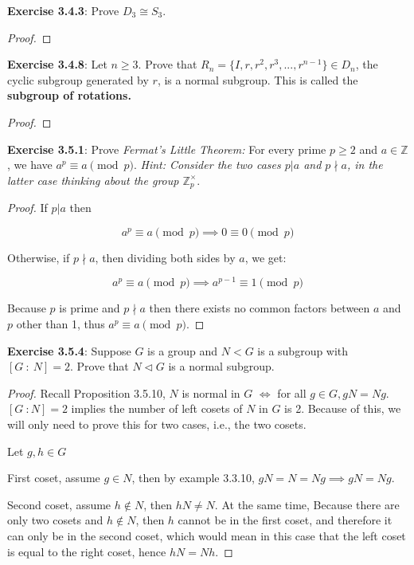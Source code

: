 \documentclass[a4paper]{article}
\begin{document}
\begin{myparindent}{0pt}
\textbf{Exercise 3.4.3}:
Prove $D_3 \cong S_3$.
\begin{proof}
\end{proof}

\textbf{Exercise 3.4.8}:
Let $n \ge 3$. Prove that $R_n = \{ I, r, r^2, r^3, ..., r^{n - 1} \} \in D_n$,
the cyclic subgroup generated by $r$, is a normal subgroup. This is called the
\textbf{subgroup of rotations.}
\begin{proof}
\end{proof}

\textbf{Exercise 3.5.1}:
Prove \textit{Fermat's Little Theorem:} For every prime $p \ge 2$ and
$a \in \mathbb{Z}$, we have $a^p \equiv a \pmod p$. \textit{Hint: Consider the
two cases $p|a$ and $p \nmid a$, in the latter case thinking about the group
$\mathbb{Z}_p^{\times}$}.
\begin{proof}
  If $p | a$ then

  \[ a^p \equiv a \pmod p \implies 0 \equiv 0 \pmod p \]

  Otherwise, if $p \nmid a$, then dividing both sides by $a$, we get:

  \[ a^p \equiv a \pmod p \implies a^{p-1} \equiv 1 \pmod p \]

  Because $p$ is prime and $p \nmid a$ then there exists no common factors
  between $a$ and $p$ other than 1, thus $a^p \equiv a \pmod p$.
\end{proof}

\textbf{Exercise 3.5.4}:
Suppose $G$ is a group and $N < G$ is a subgroup with $[G ~: ~N] = 2$. Prove
that $N \triangleleft G$ is a normal subgroup.
\begin{proof}
  Recall Proposition 3.5.10, $N$ is normal in $G$ $\iff$ for all $g \in G, gN = Ng$.
  \newline
  $[G ~: N] = 2$ implies the number of left cosets of $N$ in $G$ is 2. Because
  of this, we will only need to prove this for two cases, i.e., the two cosets.
  \newline

  Let $g, h \in G$

  First coset, assume $g \in N$, then by example 3.3.10, $gN = N = Ng \implies gN = Ng$.

  Second coset, assume $h \notin N$, then $hN \neq N$. At the same time, Because
  there are only two cosets and $h \notin N$, then $h$ cannot be in the first
  coset, and therefore it can only be in the second coset, which would mean in
  this case that the left coset is equal to the right coset, hence $hN = Nh$. \newline


\end{proof}
\end{myparindent}
\end{document}
